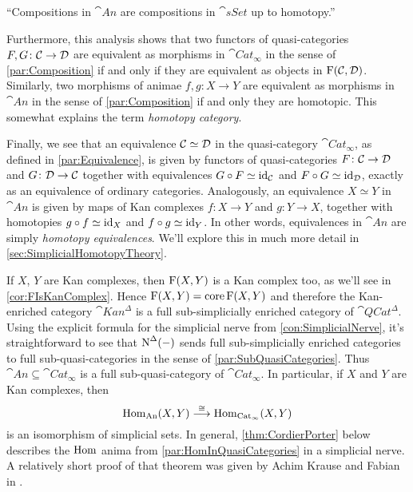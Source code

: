 \begin{exm}
\begin{alphanumerate}[label={}]
		\item\enquote{Compositions in $\cat{An}$ are compositions in $\cat{sSet}$ up to homotopy.}
	\end{alphanumerate}
	Furthermore, this analysis shows that two functors of quasi-categories $F,G\colon \mathcal{C}\rightarrow \mathcal{D}$ are equivalent as morphisms in $\cat{Cat}_\infty$ in the sense of \cref{par:Composition} if and only if they are equivalent as objects in $\operatorname{F}(\mathcal{C},\mathcal{D})$. Similarly, two morphisms of animae $f,g\colon X\rightarrow Y$ are equivalent as morphisms in $\cat{An}$ in the sense of \cref{par:Composition} if and only they are homotopic. This somewhat explains the term \emph{homotopy category}.
	
	Finally, we see that an equivalence $\mathcal{C}\simeq \mathcal{D}$ in the quasi-category $\cat{Cat}_\infty$, as defined in \cref{par:Equivalence}, is given by functors of quasi-categories $F\colon \mathcal{C}\rightarrow \mathcal{D}$ and $G\colon \mathcal{D}\rightarrow \mathcal{C}$ together with equivalences $G\circ F\simeq \operatorname{id}_{\mathcal{C}}$ and $F\circ G\simeq \operatorname{id}_{\mathcal{D}}$, exactly as an equivalence of ordinary categories. Analogously, an equivalence $X\simeq Y$ in $\cat{An}$ is given by maps of Kan complexes $f\colon X\rightarrow Y$ and $g\colon Y\rightarrow X$, together with homotopies $g\circ f\simeq\operatorname{id}_X$ and $f\circ g\simeq \operatorname{id}_Y$. In other words, equivalences in $\cat{An}$ are simply \emph{homotopy equivalences}. We'll explore this in much more detail in \cref{sec:SimplicialHomotopyTheory}.
\end{exm}
If $X$, $Y$ are Kan complexes, then $\operatorname{F}(X,Y)$ is a Kan complex too, as we'll see in \cref{cor:FIsKanComplex}. Hence $\operatorname{F}(X,Y)=\operatorname{core}\operatorname{F}(X,Y)$ and therefore the Kan-enriched category $\cat{Kan}^\Delta$ is a full sub-simplicially enriched category of $\cat{QCat}^\Delta$. Using the explicit formula for the simplicial nerve from \cref{con:SimplicialNerve}, it's straightforward to see that $\operatorname{N}^\Delta(-)$ sends full sub-simplicially enriched categories to full sub-quasi-categories in the sense of \cref{par:SubQuasiCategories}. Thus $\cat{An}\subseteq \cat{Cat}_\infty$ is a full sub-quasi-category of $\cat{Cat}_\infty$. In particular, if $X$ and $Y$ are Kan complexes, then
\begin{equation*}
	\operatorname{Hom}_{\mathrm{An}}(X,Y)\overset{\cong}{\longrightarrow}\operatorname{Hom}_{\mathrm{Cat}_\infty}(X,Y)
\end{equation*}
is an isomorphism of simplicial sets. In general, \cref{thm:CordierPorter} below describes the $\operatorname{Hom}$ anima from \cref{par:HomInQuasiCategories} in a simplicial nerve. A relatively short proof of that theorem was given by Achim Krause and Fabian in \cite{AchimFabian}.
